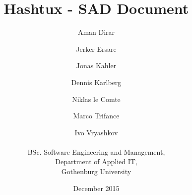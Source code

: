 \title{Hashtux - SAD Document}
\author{Aman Dirar \and Jerker Ersare \and Jonas Kahler \and Dennis Karlberg
        \and Niklas le Comte \and Marco Trifance \and Ivo Vryashkov \\ \\
        BSc. Software Engineering and Management, \\
        Department of Applied IT, \\ Gothenburg University}
\date{December 2015}
\maketitle
